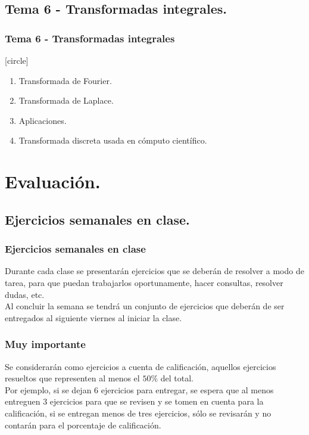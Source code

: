 \subsection{Tema 6 - Transformadas integrales.}
\begin{frame}
\frametitle{Tema 6 - Transformadas integrales}
[circle]
\begin{enumerate}[<+->]
\item Transformada de Fourier.
\item Transformada de Laplace.
\item Aplicaciones.
\item Transformada discreta usada en cómputo científico.
\end{enumerate}
\end{frame}
\section{Evaluación.}
\subsection{Ejercicios semanales en clase.}
\begin{frame}
\frametitle{Ejercicios semanales en clase}
Durante cada clase se presentarán ejercicios que se deberán de resolver a modo de tarea, para que puedan trabajarlos oportunamente, hacer consultas, resolver dudas, etc.
\\
\bigskip
\pause
Al concluir la semana se tendrá un conjunto de ejercicios que deberán de ser entregados al siguiente viernes al iniciar la clase.
\end{frame}
\begin{frame}
\frametitle{Muy importante}
Se considerarán como ejercicios a cuenta de calificación, aquellos ejercicios resueltos que representen al menos el $50\%$ del total.
\\
\bigskip
\pause
Por ejemplo, si se dejan 6 ejercicios para entregar, se espera que al menos entreguen 3 ejercicios para que se revisen y se tomen en cuenta para la calificación, si se entregan menos de tres ejercicios, sólo se revisarán y no contarán para el porcentaje de calificación.
\end{frame}
